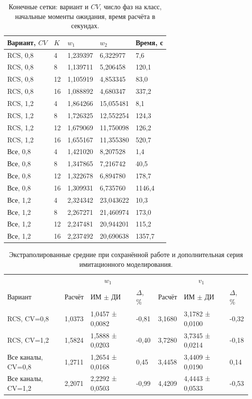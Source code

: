 \documentclass[a4paper,12pt]{article}
\begin{document}
\begin{table}[!htbp]
\centering\small\setlength{\tabcolsep}{2pt}
\begin{tabular}{@{}p{4.44cm}p{1.13cm}p{3.31cm}p{3.31cm}p{2.46cm}@{}}
\toprule
Вариант, $CV$ & $K$ & $w_1$ & $w_2$ & Время, с \\
\midrule
RCS, 0,8 & 4 & 1,239397 & 6,322977 & 7,6 \\
RCS, 0,8 & 8 & 1,139711 & 5,206458 & 120,1 \\
RCS, 0,8 & 12 & 1,105919 & 4,853345 & 83,0 \\
RCS, 0,8 & 16 & 1,088892 & 4,680347 & 337,2 \\
RCS, 1,2 & 4 & 1,864266 & 15,055481 & 8,1 \\
RCS, 1,2 & 8 & 1,726325 & 12,552254 & 124,3 \\
RCS, 1,2 & 12 & 1,679069 & 11,750098 & 126,2 \\
RCS, 1,2 & 16 & 1,655167 & 11,355380 & 520,7 \\
Все, 0,8 & 4 & 1,421020 & 8,207528 & 1,4 \\
Все, 0,8 & 8 & 1,347865 & 7,216742 & 40,5 \\
Все, 0,8 & 12 & 1,322678 & 6,894780 & 178,7 \\
Все, 0,8 & 16 & 1,309931 & 6,735760 & 1146,4 \\
Все, 1,2 & 4 & 2,324342 & 23,043622 & 10,3 \\
Все, 1,2 & 8 & 2,267271 & 21,460974 & 173,0 \\
Все, 1,2 & 12 & 2,247481 & 20,944201 & 115,2 \\
Все, 1,2 & 16 & 2,237492 & 20,690638 & 1357,7 \\
\bottomrule
\end{tabular}
\caption{Конечные сетки: вариант и \(CV\), число фаз на класс, начальные моменты ожидания, время расчёта в секундах.}
\label{tab:grids}
\end{table}

\begin{table}[!htbp]
\centering\small\setlength{\tabcolsep}{2pt}
\begin{tabular}{@{}p{4.16cm}p{1.61cm}p{2.83cm}p{1.28cm}p{1.61cm}p{2.83cm}p{1.28cm}@{}}
\toprule
 & \multicolumn{3}{c}{$w_1$} & \multicolumn{3}{c}{$v_1$} \\
Вариант & Расчёт & ИМ $\pm$ ДИ & $\Delta$, \% & Расчёт & ИМ $\pm$ ДИ & $\Delta$, \% \\
\midrule
RCS, CV=0,8 & 1,0373 & 1,0457 ± 0,0082 & -0,81 & 3,1680 & 3,1782 ± 0,0100 & -0,32 \\
RCS, CV=1,2 & 1,5824 & 1,5888 ± 0,0203 & -0,40 & 3,7280 & 3,7345 ± 0,0214 & -0,18 \\
Все каналы, CV=0,8 & 1,2711 & 1,2654 ± 0,0168 & 0,45 & 3,4458 & 3,4409 ± 0,0190 & 0,14 \\
Все каналы, CV=1,2 & 2,2071 & 2,2292 ± 0,0503 & -0,99 & 4,4209 & 4,4443 ± 0,0533 & -0,53 \\
\bottomrule
\end{tabular}
\caption{Экстраполированные средние при сохранённой работе и дополнительная серия имитационного моделирования.}
\label{tab:extrap}
\end{table}
\end{document}
